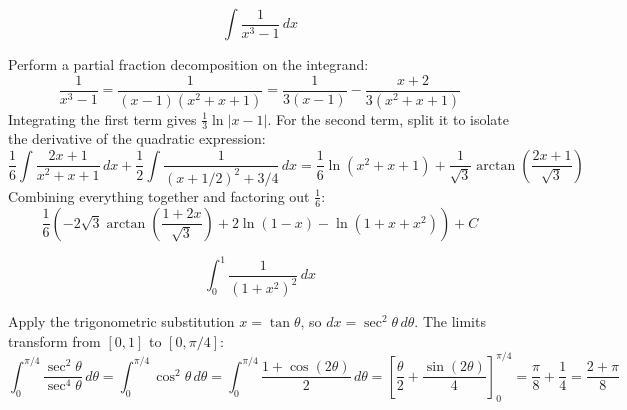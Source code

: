 \begin{questions}
    \question \[ \int \frac{1}{x^3 - 1} \,dx \]
    \begin{solution}
        Perform a partial fraction decomposition on the integrand:
        \[ \frac{1}{x^3 - 1} = \frac{1}{(x-1)(x^2+x+1)} = \frac{1}{3(x-1)} - \frac{x+2}{3(x^2+x+1)} \]
        Integrating the first term gives $\frac{1}{3}\ln|x-1|$. For the second term, split it to isolate the derivative of the quadratic expression:
        \[ \frac{1}{6}\int \frac{2x+1}{x^2+x+1} \,dx + \frac{1}{2}\int \frac{1}{(x+1/2)^2 + 3/4} \,dx = \frac{1}{6}\ln(x^2+x+1) + \frac{1}{\sqrt{3}}\arctan\left(\frac{2x+1}{\sqrt{3}}\right) \]
        Combining everything together and factoring out $\frac{1}{6}$:
        \[ \frac{1}{6} \left( -2\sqrt{3}\arctan\left(\frac{1+2x}{\sqrt{3}}\right) + 2\ln(1-x) - \ln(1+x+x^2) \right) + C \]
    \end{solution}

    \question \[ \int_{0}^{1} \frac{1}{(1 + x^2)^2} \,dx \]
    \begin{solution}
        Apply the trigonometric substitution $x = \tan\theta$, so $dx = \sec^2\theta \,d\theta$. The limits transform from $[0, 1]$ to $[0, \pi/4]$:
        \[ \int_{0}^{\pi/4} \frac{\sec^2\theta}{\sec^4\theta} \,d\theta = \int_{0}^{\pi/4} \cos^2\theta \,d\theta = \int_{0}^{\pi/4} \frac{1 + \cos(2\theta)}{2} \,d\theta = \left[ \frac{\theta}{2} + \frac{\sin(2\theta)}{4} \right]_0^{\pi/4} = \frac{\pi}{8} + \frac{1}{4} = \frac{2+\pi}{8} \]
    \end{solution}

\end{questions}

